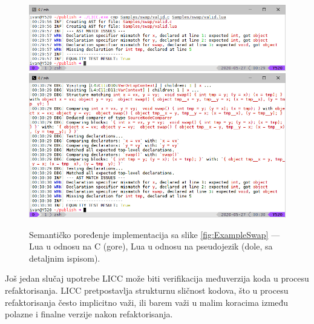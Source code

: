 \begin{figure}[h!]
\centering
\includegraphics[scale=0.7]{images/eval/cmp_rewrite.png}
\includegraphics[scale=0.7]{images/eval/cmp_rewrite_v.png}
\caption{Semantičko poređenje implementacija sa slike \ref{fig:ExampleSwap} --- Lua u odnosu na C (gore), Lua u odnosu na pseudojezik (dole, sa detaljnim ispisom).}
\label{fig:ExampleSwapCompareValidRewrite}
\end{figure}

Još jedan slučaj upotrebe LICC može biti verifikacija međuverzija koda u procesu refaktorisanja. LICC pretpostavlja strukturnu sličnost kodova, što u procesu refaktorisanja često implicitno važi, ili barem važi u malim koracima između polazne i finalne verzije nakon refaktorisanja. 


